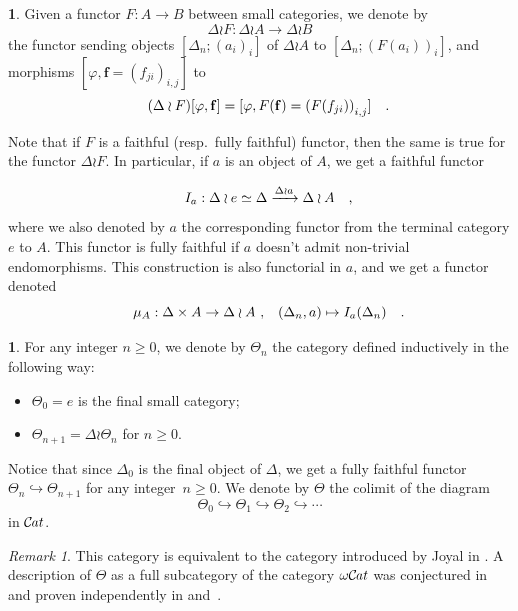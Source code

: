 \documentclass[10pt, english, a4paper, nothms]{amsart}
\theoremstyle{plain}
\theoremstyle{remark}
\newtheorem{remark}[theorem]{Remark}
\theoremstyle{definition}
\newtheorem{paragr}[theorem]{}
\numberwithin{equation}{theorem}
\renewcommand\geq\geqslant
\newcommand{\Cat}{{\mathcal{C}\mspace{-2.mu}\it{at}}}
\newcommand{\mdvirg}{\text{ ,}\hspace{10pt}}
\newcommand\zbox[1]{\makebox[0pt][l]{#1}}
\newcommand\pbox[1]{\zbox{\quad #1}} %
\begin{document}
\begin{paragr}
\label{def:mu_A}
Given a functor $F: A \to B$ between small categories, we denote by 
\[
\Delta\wr F: \Delta\wr A \to \Delta\wr B  
\]
the functor sending objects $[\Delta_n;(a_i)_i]$ of
$\Delta \wr A$ to $ [\Delta_n;(F(a_i))_{i}]$, and
morphisms $[\varphi, \mathbf{f}=(f_{ji})_{i,j}]$ to 
\[
(\Delta\wr F)[\varphi,\mathbf{f}] = [\varphi, F(\mathbf{f}) =
\left(F(f_{ji})\right)_{i,j}] \pbox{.}
\]

Note that if $F$ is a faithful (resp.~fully faithful) functor, then
the same is true for the functor $\Delta\wr F$. In particular, if $a$
is an object of $A$, we get a faithful functor

\[
I_a: \Delta \wr e \simeq \Delta \xrightarrow{\Delta \wr a} \Delta \wr
A \pbox{,}
\]
where we also denoted by $a$ the corresponding functor from the
terminal category $e$ to $A$. This functor is fully faithful if $a$
doesn't admit non-trivial endomorphisms. 
This construction is also functorial in $a$, and we get a functor
denoted 
\[
\mu_A: \Delta \times A \to \Delta \wr A \mdvirg (\Delta_n, a) \mapsto
I_a(\Delta_n) \pbox{.}
\]
\end{paragr}

\begin{paragr}

\label{defThetaCouronne} For any integer $n\geq 0$, we denote by
$\Theta_n$ the category defined inductively in the following way:

\begin{itemize}
\item $\Theta_0 = e$ is the final small category; 
\item $\Theta_{n+1} = \Delta \wr \Theta_n$ for $n\geq 0$.
\end{itemize}
Notice that since $\Delta_0$ is the final object of $\Delta$, we get a
fully faithful functor $\Theta_n \hookrightarrow \Theta_{n+1}$ for any
integer~$n \geq 0$. We denote by $\Theta$ the colimit of the diagram
\[
\Theta_0 \hookrightarrow \Theta_1 \hookrightarrow \Theta_2
\hookrightarrow \cdots 
\]
in $\Cat$.
\end{paragr}

\begin{remark}\label{remark:thetaAltDef}
This category is equivalent to the category introduced by Joyal in
\cite{joyal1997disks}. A description of $\Theta$ as a full subcategory
of the category $\omega\Cat$ was conjectured in
\cite{batanin2000multitude} and proven independently in
\cite{makkai2001duality} and~\cite{berger2007iterated}. 
\end{remark}
\end{document}
